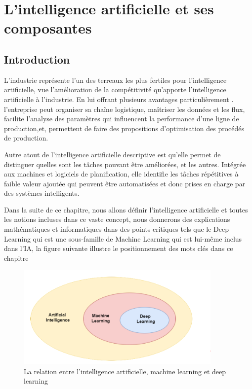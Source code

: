 \chapter{L’intelligence artificielle et ses composantes}
\section{Introduction}
L’industrie représente l’un des terreaux les plus fertiles pour l’intelligence artificielle, vue  l’amélioration de la compétitivité qu'apporte l’intelligence artificielle à l’industrie. En lui offrant plusieurs avantages particulièrement  . l’entreprise peut organiser sa chaîne logistique, maîtriser  les données et les flux, facilite l’analyse des paramètres qui influencent la performance d’une ligne de production,et, permettent de faire des propositions d’optimisation des procédés de production. 

Autre atout de l’intelligence artificielle descriptive est qu’elle permet de distinguer quelles sont les tâches pouvant être améliorées, et les autres. Intégrée aux machines et logiciels de planification, elle identifie les tâches répétitives à faible valeur ajoutée qui peuvent être automatisées et donc prises en charge par des systèmes intelligents. 

Dans la suite de ce chapitre, nous allons définir l'intelligence artificielle et toutes les notions incluses dans ce vaste concept, nous donnerons des explications mathématiques et informatiques dans des points critiques tels que le Deep Learning qui est une sous-famille de Machine Learning qui est lui-même inclus dans l'IA, la figure suivante illustre le positionnement des mots clés dans ce chapitre


\begin{figure}[h]
    \centering
    \includegraphics[width=10cm]{assets/PartOne/Chaptertwo/relationentreintelligenceartificielleetmachinelearningetdeeplearning.png}
    \caption{La relation entre l'intelligence artificielle, machine learning et deep learning}
    \label{relationentreintelligenceartificielleetmachinelearningetdeeplearning}
    \end{figure}

